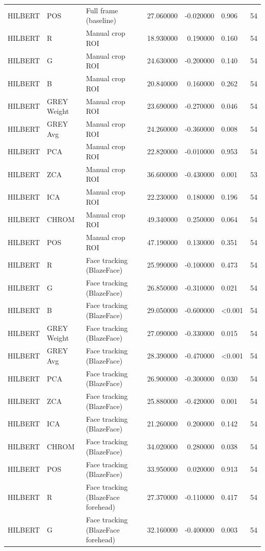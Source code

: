 \begin{table}[htbp]
\begin{tabular}{l l l r r l r}
HILBERT & POS & Full frame (baseline) & 27.060000 & -0.020000 & 0.906 & 54 \\
HILBERT & R & Manual crop ROI & 18.930000 & 0.190000 & 0.160 & 54 \\
HILBERT & G & Manual crop ROI & 24.630000 & -0.200000 & 0.140 & 54 \\
HILBERT & B & Manual crop ROI & 20.840000 & 0.160000 & 0.262 & 54 \\
HILBERT & GREY Weight & Manual crop ROI & 23.690000 & -0.270000 & 0.046 & 54 \\
HILBERT & GREY Avg & Manual crop ROI & 24.260000 & -0.360000 & 0.008 & 54 \\
HILBERT & PCA & Manual crop ROI & 22.820000 & -0.010000 & 0.953 & 54 \\
HILBERT & ZCA & Manual crop ROI & 36.600000 & -0.430000 & 0.001 & 53 \\
HILBERT & ICA & Manual crop ROI & 22.230000 & 0.180000 & 0.196 & 54 \\
HILBERT & CHROM & Manual crop ROI & 49.340000 & 0.250000 & 0.064 & 54 \\
HILBERT & POS & Manual crop ROI & 47.190000 & 0.130000 & 0.351 & 54 \\
HILBERT & R & Face tracking (BlazeFace) & 25.990000 & -0.100000 & 0.473 & 54 \\
HILBERT & G & Face tracking (BlazeFace) & 26.850000 & -0.310000 & 0.021 & 54 \\
HILBERT & B & Face tracking (BlazeFace) & 29.050000 & -0.600000 & <0.001 & 54 \\
HILBERT & GREY Weight & Face tracking (BlazeFace) & 27.090000 & -0.330000 & 0.015 & 54 \\
HILBERT & GREY Avg & Face tracking (BlazeFace) & 28.390000 & -0.470000 & <0.001 & 54 \\
HILBERT & PCA & Face tracking (BlazeFace) & 26.900000 & -0.300000 & 0.030 & 54 \\
HILBERT & ZCA & Face tracking (BlazeFace) & 25.880000 & -0.420000 & 0.001 & 54 \\
HILBERT & ICA & Face tracking (BlazeFace) & 21.260000 & 0.200000 & 0.142 & 54 \\
HILBERT & CHROM & Face tracking (BlazeFace) & 34.020000 & 0.280000 & 0.038 & 54 \\
HILBERT & POS & Face tracking (BlazeFace) & 33.950000 & 0.020000 & 0.913 & 54 \\
HILBERT & R & Face tracking (BlazeFace forehead) & 27.370000 & -0.110000 & 0.417 & 54 \\
HILBERT & G & Face tracking (BlazeFace forehead) & 32.160000 & -0.400000 & 0.003 & 54 \\

\end{tabular}
\end{table}
